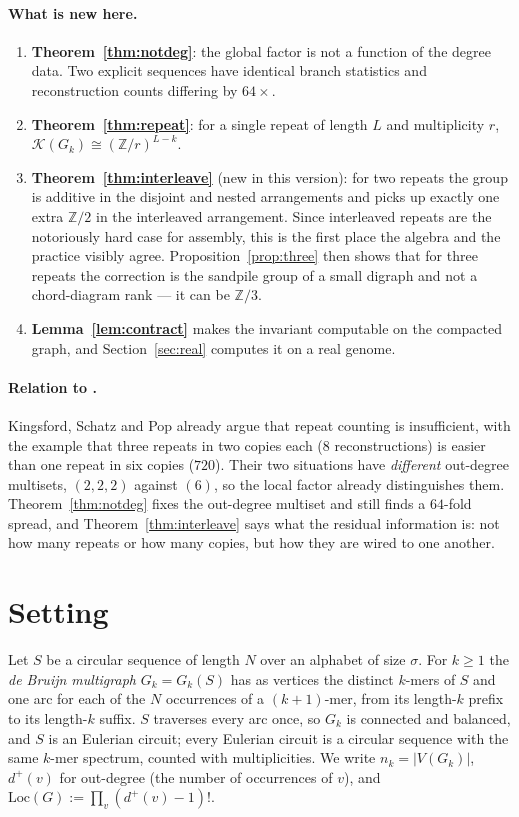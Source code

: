 \documentclass[11pt]{article}
\theoremstyle{plain}
\theoremstyle{definition}
\theoremstyle{remark}
\newcommand{\Z}{\mathbb{Z}}
\newcommand{\K}{\mathcal{K}}
\newcommand{\Loc}{\mathrm{Loc}}
\begin{document}
\paragraph{What is new here.}
\begin{enumerate}
\item[(i)] \textbf{Theorem~\ref{thm:notdeg}}: the global factor is not a function of the
degree data. Two explicit sequences have identical branch statistics and reconstruction
counts differing by $64\times$.
\item[(ii)] \textbf{Theorem~\ref{thm:repeat}}: for a single repeat of length $L$ and
multiplicity $r$, $\K(G_k)\cong(\Z/r)^{L-k}$.
\item[(iii)] \textbf{Theorem~\ref{thm:interleave}} (new in this version): for two repeats
the group is additive in the disjoint and nested arrangements and picks up exactly one
extra $\Z/2$ in the interleaved arrangement. Since interleaved repeats are the notoriously
hard case for assembly, this is the first place the algebra and the practice visibly
agree. Proposition~\ref{prop:three} then shows that for three repeats the correction is
the sandpile group of a small digraph and not a chord-diagram rank --- it can be $\Z/3$.
\item[(iv)] \textbf{Lemma~\ref{lem:contract}} makes the invariant computable on the
compacted graph, and Section~\ref{sec:real} computes it on a real genome.
\end{enumerate}

\paragraph{Relation to \cite{KSP}.}
Kingsford, Schatz and Pop already argue that repeat counting is insufficient, with the
example that three repeats in two copies each ($8$ reconstructions) is easier than one
repeat in six copies ($720$). Their two situations have \emph{different} out-degree
multisets, $(2,2,2)$ against $(6)$, so the local factor already distinguishes them.
Theorem~\ref{thm:notdeg} fixes the out-degree multiset and still finds a $64$-fold spread,
and Theorem~\ref{thm:interleave} says what the residual information is: not how many
repeats or how many copies, but how they are wired to one another.

\section{Setting}\label{sec:setting}

Let $S$ be a circular sequence of length $N$ over an alphabet of size $\sigma$. For $k\ge1$
the \emph{de Bruijn multigraph} $G_k=G_k(S)$ has as vertices the distinct $k$-mers of $S$
and one arc for each of the $N$ occurrences of a $(k{+}1)$-mer, from its length-$k$ prefix
to its length-$k$ suffix. $S$ traverses every arc once, so $G_k$ is connected and balanced,
and $S$ is an Eulerian circuit; every Eulerian circuit is a circular sequence with the
same $k$-mer spectrum, counted with multiplicities. We write $n_k=|V(G_k)|$, $d^{+}(v)$ for
out-degree (the number of occurrences of $v$), and $\Loc(G):=\prod_v(d^{+}(v)-1)!$.
\end{document}
